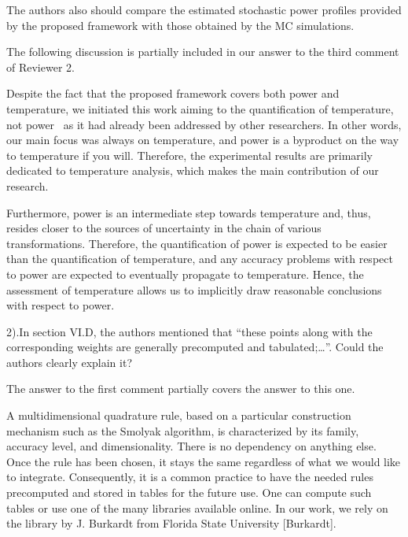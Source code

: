 \begin{authors}
\end{authors}

\begin{reviewer}
The authors also should compare the estimated stochastic power profiles provided by the proposed framework with those obtained by the MC simulations.
\end{reviewer}
\begin{authors}
The following discussion is partially included in our answer to the third comment of Reviewer 2.

Despite the fact that the proposed framework covers both power and temperature, we initiated this work aiming to the quantification of temperature, not power \perse\ as it had already been addressed by other researchers.
In other words, our main focus was always on temperature, and power is a byproduct on the way to temperature if you will.
Therefore, the experimental results are primarily dedicated to temperature analysis, which makes the main contribution of our research.

Furthermore, power is an intermediate step towards temperature and, thus, resides closer to the sources of uncertainty in the chain of various transformations.
Therefore, the quantification of power is expected to be easier than the quantification of temperature, and any accuracy problems with respect to power are expected to eventually propagate to temperature.
Hence, the assessment of temperature allows us to implicitly draw reasonable conclusions with respect to power.


\end{authors}

\begin{reviewer}
2).In section VI.D, the authors mentioned that ``these points along with the corresponding weights are generally precomputed and tabulated;\ldots''. Could the authors clearly explain it?
\end{reviewer}
\begin{authors}
The answer to the first comment partially covers the answer to this one.

A multidimensional quadrature rule, based on a particular construction mechanism such as the Smolyak algorithm, is characterized by its family, accuracy level, and dimensionality.
There is no dependency on anything else.
Once the rule has been chosen, it stays the same regardless of what we would like to integrate.
Consequently, it is a common practice to have the needed rules precomputed and stored in tables for the future use.
One can compute such tables or use one of the many libraries available online.
In our work, we rely on the library by J. Burkardt from Florida State University [Burkardt].


\end{authors}

